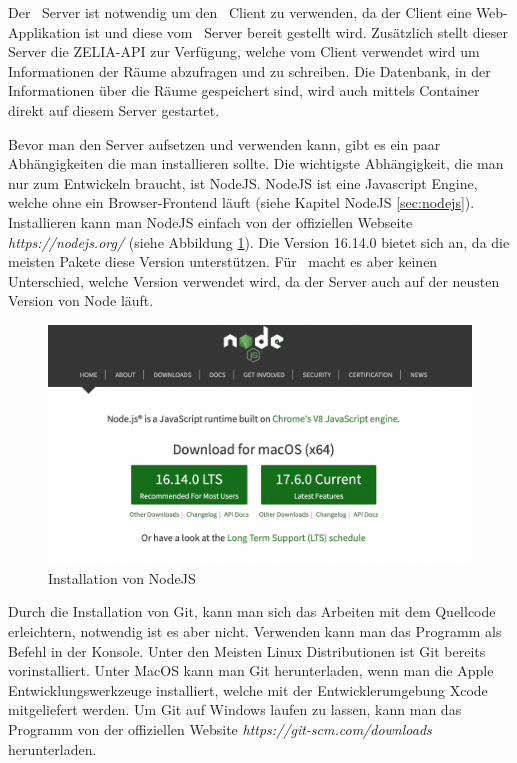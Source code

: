 
Der \ZELIA\ Server ist notwendig um den \ZELIA\ Client zu verwenden, da der Client eine Web-Applikation ist und diese vom \ZELIA\ Server bereit gestellt wird. Zusätzlich stellt dieser Server die ZELIA-API zur Verfügung, welche vom Client verwendet wird um Informationen der Räume abzufragen und zu schreiben. Die Datenbank, in der Informationen über die Räume gespeichert sind, wird auch mittels Container direkt auf diesem Server gestartet.



Bevor man den Server aufsetzen und verwenden kann, gibt es ein paar Abhängigkeiten die man installieren sollte. Die wichtigste Abhängigkeit, die man nur zum Entwickeln braucht, ist NodeJS. NodeJS ist eine Javascript Engine, welche ohne ein Browser-Frontend läuft (siehe Kapitel NodeJS \ref{sec:nodejs}). Installieren kann man NodeJS einfach von der offiziellen Webseite \emph{https://nodejs.org/} (siehe Abbildung \ref{fig:nodejsdownload}). Die Version 16.14.0 bietet sich an, da die meisten Pakete diese Version unterstützen. Für \ZELIA\ macht es aber keinen Unterschied, welche Version verwendet wird, da der Server auch auf der neusten Version von Node läuft.

\begin{figure}[H]
    \centering
    \includegraphics[width=120mm]{media/Handbuch/nodejs.png}
    \caption{Installation von NodeJS}
    \label{fig:nodejsdownload}
\end{figure}


Durch die Installation von Git, kann man sich das Arbeiten mit dem Quellcode erleichtern, notwendig ist es aber nicht. Verwenden kann man das Programm als Befehl in der Konsole. Unter den Meisten Linux Distributionen ist Git bereits vorinstalliert. Unter MacOS kann man Git herunterladen, wenn man die Apple Entwicklungswerkzeuge installiert, welche mit der Entwicklerumgebung Xcode mitgeliefert werden. Um Git auf Windows laufen zu lassen, kann man das Programm von der offiziellen Website \emph{https://git-scm.com/downloads} herunterladen.

